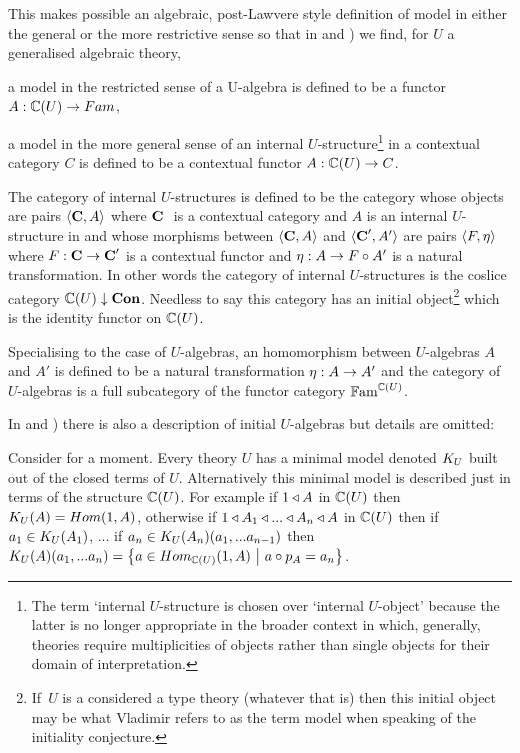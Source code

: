 {This makes possible an  algebraic, post-Lawvere
style  definition of model in either the general or the more restrictive sense so that in 
\cite{Cartmell78} and  \cite{Cartmell86}) we find,
for $U$ a generalised algebraic theory, 
\begin{point}
 a model in the restricted sense of a U-algebra is defined to be a functor $A: \ccat[C](U) \morph Fam$, 
\end{point}
\begin{point}
a model in the more general sense of an internal $U$-structure\footnote{The  term `internal $U$-structure is chosen over `internal $U$-object' because the latter
is no longer appropriate in the broader context in which, generally, theories require multiplicities of objects rather than single objects for their domain of interpretation.} in a contextual category
$C$ is defined to be a contextual functor $A: \ccat[C](U) \morph C$.
\end{point}
The category of internal $U$-structures is defined to be the category whose objects
are pairs $\tuple{\catc,A}$ 
where $\catcw$ is a contextual 
category and $A$ is an internal 
$U$-structure in
 \catcw and whose morphisms between $\tuple{\catc,A}$ and $\tuple{\catc',A'}$ are pairs $\tuple{F, \eta}$ where
$F: \catc \morph \catc'$ is a contextual functor and $\eta: A  \morph  F \circ A'$ is a natural transformation.
In other words the category of internal $U$-structures
is  the coslice category
$\CofU \downarrow \catCon$. Needless to say this category has an initial object\footnote{If\ $U$ is a considered a type theory (whatever that is) then 
this initial object may be what Vladimir  refers
to as the term model when speaking of the initiality conjecture.}
which is the identity functor on  $\CofU$.
 
Specialising to the case of $U$-algebras,  an homomorphism between $U$-algebras $A$ and $A'$ is defined to be a 
natural transformation $\eta: A \morph A'$ and the category of $U$-algebras is a full subcategory of the 
functor category $\Fam^{\CofU}$. 

\note 
In \cite{Cartmell78} and  \cite{Cartmell86}) there is also a description of initial $U$-algebras but details are omitted:
\begin{tightquote}
Consider for a moment. Every theory $U$ has a minimal model denoted $\KU$ built out of the closed terms of $U$. Alternatively this minimal model is described just in terms of the structure $\CofU$. For example
if $1 \base A$ in $\CofU$ then 
$\KU(A)=Hom(1,A)$, otherwise if $1 \base A_1 \base ... \base A_n \base A$ in $\CofU$
then if $a_1 \in \KU(A_1)$, ... if $a_n \in \KU(A_n)(a_1,...a_{n-1})$ then 
$\KU(A)(a_1,...a_n)=\setsuchthat{a\in Hom_{\CofU}(1,A)}{a \circ p_A = a_n}$. \\
\end{tightquote} 

}
